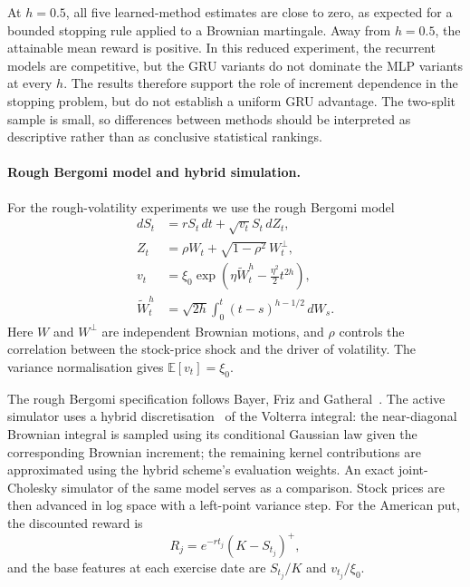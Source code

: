 \begin{table}[ht]
\centering
\scriptsize
\caption{fBm stopping results. Entries are mean test rewards; parentheses
show the standard deviation across the two split-level estimates.}
\label{tab:fbm-results}

\end{table}

At $h=0.5$, all five learned-method estimates are close to zero, as
expected for a bounded stopping rule applied to a Brownian martingale.
Away from $h=0.5$, the attainable mean reward is positive. In this
reduced experiment, the recurrent models are competitive, but the GRU
variants do not dominate the MLP variants at every $h$. The results
therefore support the role of increment dependence in the stopping
problem, but do not establish a uniform GRU advantage. The two-split
sample is small, so differences between methods should be interpreted
as descriptive rather than as conclusive statistical rankings.

\paragraph{Rough Bergomi model and hybrid simulation.}
For the rough-volatility experiments we use the rough Bergomi model
\begin{align}
  dS_t &= rS_t\,dt+\sqrt{v_t}S_t\,dZ_t,\\
  Z_t &= \rho W_t+\sqrt{1-\rho^2}\,W_t^\perp,\\
  v_t &= \xi_0\exp\!\left(\eta\widetilde W_t^h
                    -\frac{\eta^2}{2}t^{2h}\right),\\
  \widetilde W_t^h &= \sqrt{2h}\int_0^t(t-s)^{h-1/2}\,dW_s.
  \label{eq:rough-bergomi}
\end{align}
Here $W$ and $W^\perp$ are independent Brownian motions, and $\rho$
controls the correlation between the stock-price shock and the driver
of volatility. The variance normalisation gives
$\mathbb E[v_t]=\xi_0$.

The rough Bergomi specification follows Bayer, Friz and Gatheral~\cite{bfg2016}. The
active simulator uses a hybrid discretisation~\cite{blp2017} of the Volterra
integral: the near-diagonal Brownian integral is sampled using its
conditional Gaussian law given the corresponding Brownian increment;
the remaining kernel contributions are approximated using the hybrid
scheme's evaluation weights. An exact joint-Cholesky simulator of the
same model serves as a comparison. Stock prices are
then advanced in log space with a left-point variance step. For the
American put, the discounted reward is
\begin{equation}
  R_j=e^{-rt_j}(K-S_{t_j})^+,
\end{equation}
and the base features at each exercise date are $S_{t_j}/K$ and
$v_{t_j}/\xi_0$.


